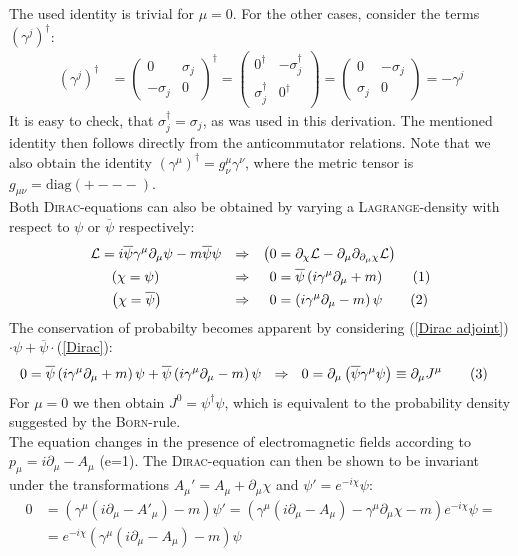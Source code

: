\documentclass[a4paper,12pt]{article}
\newcommand\numberthis{\addtocounter{equation}{1}\tag{\theequation}}
\newcommand{\kla}{}
\newcommand{\tecxt}{}
\begin{document}
The used identity is trivial for $\mu=0$. For the other cases, consider the terms $(\gamma^j)^\dagger$:
\begin{align*}
(\gamma^j)^\dagger&=\begin{pmatrix}
0 & \sigma_j \\ -\sigma_j & 0
\end{pmatrix}^\dagger=\begin{pmatrix}
0^\dagger & -\sigma_j^\dagger \\ \sigma_j^\dagger & 0^\dagger
\end{pmatrix}=\begin{pmatrix}
0 & -\sigma_j \\ \sigma_j & 0
\end{pmatrix}=-\gamma^j
\end{align*}
It is easy to check, that $\sigma_j^\dagger=\sigma_j$, as was used in this derivation. The mentioned identity then follows directly from the anticommutator relations. Note that we also obtain the identity $(\gamma^\mu)^\dagger = g_\nu^\mu\gamma^\nu$, where the metric tensor is $g_{\mu\nu}=\tecxt\text{diag}(+---)$.\\
Both \textsc{Dirac}-equations can also be obtained by varying a \textsc{Lagrange}-density with respect to $\psi$ or $\overline{\psi}$ respectively:
\begin{align*}
\mathcal{L}&=i\overline{\psi}\gamma^\mu\partial_\mu\psi - m\overline{\psi}\psi &\Rightarrow &&\big(0&=\partial_\chi\mathcal{L} - \partial_\mu\partial_{\partial_\mu\chi}\mathcal{L}\big)\\
&\ \ \kla\left( {\chi=\psi} \right)\ \ &\Rightarrow &&\ 0&=\overline{\psi}\kla\left( {i\gamma^\mu\partial_\mu +m} \right)\numberthis\label{Dirac adjoint}\\
&\ \ \kla\left( {\chi=\overline{\psi}} \right)\ \ &\Rightarrow &&\ 0&=\kla\left( {i\gamma^\mu\partial_\mu -m} \right)\psi\numberthis\label{Dirac}
\end{align*}
The conservation of probabilty becomes apparent by considering (\ref{Dirac adjoint})$\cdot\psi+\overline{\psi}\cdot$(\ref{Dirac}):
\begin{align*}
0&=\overline{\psi}\kla\left( {i\gamma^\mu\partial_\mu +m} \right)\psi + \overline{\psi}\kla\left( {i\gamma^\mu\partial_\mu -m} \right)\psi\ \ \Rightarrow\ \ 0=\partial_\mu\kla\left( {\overline{\psi}\gamma^\mu\psi} \right)\equiv\partial_\mu J^\mu\numberthis\label{local conservation}
\end{align*}
For $\mu=0$ we then obtain $J^0=\psi^\dagger\psi$, which is equivalent to the probability density suggested by the \textsc{Born}-rule.\\ 
The equation changes in the presence of electromagnetic fields according to $p_\mu=i\partial_\mu - A_\mu$ (e=1). The \textsc{Dirac}-equation can then be shown to be invariant under the transformations $A_\mu'=A_\mu +\partial_\mu\chi$ and $\psi'=e^{-i\chi}\psi$:
\begin{align*}
0&=\kla\left( {\gamma^\mu(i\partial_\mu-A'_\mu)-m} \right)\psi'=\kla\left( {\gamma^\mu(i\partial_\mu-A_\mu) - \gamma^\mu\partial_\mu\chi -m } \right)e^{-i\chi}\psi=\\
&=e^{-i\chi}\kla\left( {\gamma^\mu(i\partial_\mu-A_\mu)-m} \right)\psi
\end{align*}
\end{document}
